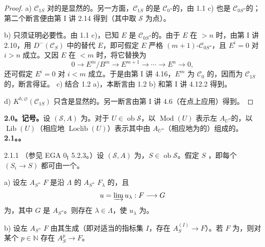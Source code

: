 \begin{proof}
a) $\mathcal C_{1S}$ 对的是显然的。另一方面，$\mathcal C_{1S}$ 的是 $\mathcal C_0$-的，由 1.1 c) 也是 $\mathcal C_{0S}$-的；第二个断言便由第 I 讲 2.14 得到（其中取 $\mathcal S$ 为点）。

b) 只须证明必要性。由 1.1 c)，已知 $E$ 是 $\mathcal C_{0S}$-的。由于 $E$ 在 $>n$ 时，由第 I 讲 2.10，用 $D^-(\mathcal C_S)$ 中的替代 $E$，即可假定 $E$ 严格 $(m+1)$-$\mathcal C_{0S}$-，且 $E^i=0$ 对 $i>n$ 成立。又因 $E$ 在 $<m$ 时，将它替换为
\[
0\longrightarrow E^m/B^m\longrightarrow E^{m+1}\longrightarrow\cdots\longrightarrow E^n\longrightarrow0,
\]
还可假定 $E^i=0$ 对 $i<m$ 成立。于是由第 I 讲 4.16，$E^m$ 为 $\mathcal C_0$ 的，因而为 $\mathcal C_{1S}$ 的，断言得证。
c) 结合 1.2 a)，本断言由 1.2 b) 和第 I 讲 4.12.2 得到。

d) $K^{b,\varnothing}(\mathcal C_{1S})$ 只含是显然的。另一断言由第 I 讲 4.6（在点上应用）得到。
\end{proof}
\textbf{2.0。记号。}设 $(\mathcal S,A)$ 为。对于 $U\in\operatorname{ob}\mathcal S$，以 $\operatorname{Mod}(U)$ 表示左 $A_U$-的，以 $\operatorname{Lib}(U)$（相应地 $\operatorname{Loclib}(U)$）表示其中由 $A_U$-（相应地为的）组成的。
\textbf{2.1。。}
\begin{SGAresult}{}{2.1.1}
（参见 EGA $0_{\mathrm I}$ 5.2.3。）设 $(\mathcal S,A)$ 为，$S\in\operatorname{ob}\mathcal S$。假定 $S$ ，即每个 $(S_i\to S)$ 都可由一个。

a) 设左 $A_S$- $F$ 是沿 $\Lambda$ 的 $A_S$- $F_\lambda$ 的，且
\[
u=\varinjlim u_\lambda:F\longrightarrow G
\]
为，其中 $G$ 是 $A_S$-。则存在 $\lambda\in\Lambda$，使 $u_\lambda$ 为。

b) 设左 $A_S$- $F$ 由其生成（即对适当的指标集 $I$，存在 $A_S^{(I)}\to F$）。若 $F$ 为，则对某个 $p\in\mathbb N$ 存在 $A_S^p\to F$。
\end{SGAresult}
